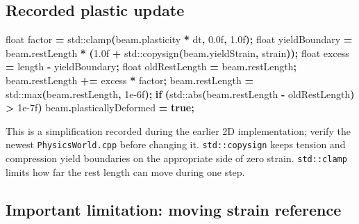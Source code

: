 \documentclass[
  10pt,
  a4paper,
]{article}
\newenvironment{Shaded}{\begin{snugshade}}{\end{snugshade}}
\newcommand{\BuiltInTok}[1]{#1}
\newcommand{\ControlFlowTok}[1]{\textcolor[rgb]{0.13,0.29,0.53}{\textbf{#1}}}
\newcommand{\DataTypeTok}[1]{\textcolor[rgb]{0.13,0.29,0.53}{#1}}
\newcommand{\FloatTok}[1]{\textcolor[rgb]{0.00,0.00,0.81}{#1}}
\newcommand{\KeywordTok}[1]{\textcolor[rgb]{0.13,0.29,0.53}{\textbf{#1}}}
\newcommand{\NormalTok}[1]{#1}
\newcommand{\OperatorTok}[1]{\textcolor[rgb]{0.81,0.36,0.00}{\textbf{#1}}}
\begin{document}
\subsection{Recorded plastic update}\label{recorded-plastic-update}

\begin{Shaded}
\begin{Highlighting}[]
\DataTypeTok{float}\NormalTok{ factor }\OperatorTok{=} \BuiltInTok{std::}\NormalTok{clamp}\OperatorTok{(}\NormalTok{beam}\OperatorTok{.}\NormalTok{plasticity }\OperatorTok{*}\NormalTok{ dt}\OperatorTok{,} \FloatTok{0.0}\BuiltInTok{f}\OperatorTok{,} \FloatTok{1.0}\BuiltInTok{f}\OperatorTok{);}
\DataTypeTok{float}\NormalTok{ yieldBoundary }\OperatorTok{=}\NormalTok{ beam}\OperatorTok{.}\NormalTok{restLength }\OperatorTok{*}
    \OperatorTok{(}\FloatTok{1.0}\BuiltInTok{f} \OperatorTok{+} \BuiltInTok{std::}\NormalTok{copysign}\OperatorTok{(}\NormalTok{beam}\OperatorTok{.}\NormalTok{yieldStrain}\OperatorTok{,}\NormalTok{ strain}\OperatorTok{));}
\DataTypeTok{float}\NormalTok{ excess }\OperatorTok{=}\NormalTok{ length }\OperatorTok{{-}}\NormalTok{ yieldBoundary}\OperatorTok{;}
\DataTypeTok{float}\NormalTok{ oldRestLength }\OperatorTok{=}\NormalTok{ beam}\OperatorTok{.}\NormalTok{restLength}\OperatorTok{;}
\NormalTok{beam}\OperatorTok{.}\NormalTok{restLength }\OperatorTok{+=}\NormalTok{ excess }\OperatorTok{*}\NormalTok{ factor}\OperatorTok{;}
\NormalTok{beam}\OperatorTok{.}\NormalTok{restLength }\OperatorTok{=} \BuiltInTok{std::}\NormalTok{max}\OperatorTok{(}\NormalTok{beam}\OperatorTok{.}\NormalTok{restLength}\OperatorTok{,} \FloatTok{1e{-}6}\BuiltInTok{f}\OperatorTok{);}
\ControlFlowTok{if} \OperatorTok{(}\BuiltInTok{std::}\NormalTok{abs}\OperatorTok{(}\NormalTok{beam}\OperatorTok{.}\NormalTok{restLength }\OperatorTok{{-}}\NormalTok{ oldRestLength}\OperatorTok{)} \OperatorTok{\textgreater{}} \FloatTok{1e{-}7}\BuiltInTok{f}\OperatorTok{)}
\NormalTok{    beam}\OperatorTok{.}\NormalTok{plasticallyDeformed }\OperatorTok{=} \KeywordTok{true}\OperatorTok{;}
\end{Highlighting}
\end{Shaded}

This is a simplification recorded during the earlier 2D implementation;
verify the newest \texttt{PhysicsWorld.cpp} before changing it.
\texttt{std::copysign} keeps tension and compression yield boundaries on
the appropriate side of zero strain. \texttt{std::clamp} limits how far
the rest length can move during one step.

\subsection{Important limitation: moving strain
reference}\label{important-limitation-moving-strain-reference}
\end{document}
